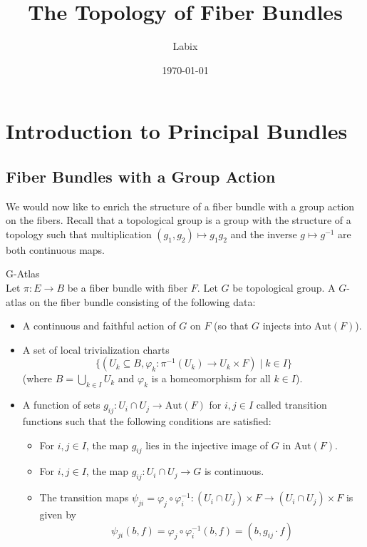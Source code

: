 \documentclass[a4paper]{article}
\title{The Topology of Fiber Bundles}
\author{Labix}
\date{\today}
\begin{document}
\maketitle
\pagebreak
\tableofcontents

\pagebreak
\section{Introduction to Principal Bundles}
\subsection{Fiber Bundles with a Group Action}
We would now like to enrich the structure of a fiber bundle with a group action on the fibers. Recall that a topological group is a group with the structure of a topology such that multiplication $(g_1,g_2)\mapsto g_1g_2$ and the inverse $g\mapsto g^{-1}$ are both continuous maps. 

\begin{defn}{G-Atlas}{}\\
Let $\pi:E\to B$ be a fiber bundle with fiber $F$. Let $G$ be topological group. A $G$-atlas on the fiber bundle consisting of the following data: 
\begin{itemize}
\item A continuous and faithful action of $G$ on $F$ (so that $G$ injects into $\text{Aut}(F)$). 
\item A set of local trivialization charts $$\{(U_k\subseteq B,\varphi_k:\pi^{-1}(U_k)\to U_k\times F)\;|\;k\in I\}$$ (where $B=\bigcup_{k\in I}U_k$ and $\varphi_k$ is a homeomorphism for all $k\in I$). 
\item A function of sets $g_{ij}:U_i\cap U_j\to\text{Aut}(F)$ for $i,j\in I$ called transition functions such that the following conditions are satisfied: 
\begin{itemize}
\item For $i,j\in I$, the map $g_{ij}$ lies in the injective image of $G$ in $\text{Aut}(F)$. 
\item For $i,j\in I$, the map $g_{ij}:U_i\cap U_j\to G$ is continuous. 
\item The transition maps $\psi_{ji}=\varphi_j\circ\varphi_i^{-1}:(U_i\cap U_j)\times F\to(U_i\cap U_j)\times F$ is given by $$\psi_{ji}(b,f)=\varphi_j\circ\varphi_i^{-1}(b,f)=(b,g_{ij}\cdot f)$$
\end{itemize}
\end{itemize}
\end{defn}
\end{document}
